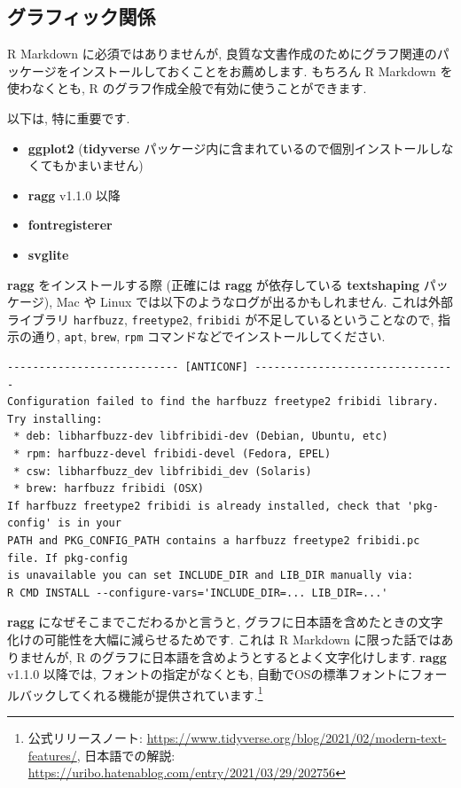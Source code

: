 \documentclass[
]{ltjsarticle}
\providecommand{\tightlist}{%
  \setlength{\itemsep}{0pt}\setlength{\parskip}{0pt}}
\begin{document}
\hypertarget{ux30b0ux30e9ux30d5ux30a3ux30c3ux30afux95a2ux4fc2}{%
\subsection{グラフィック関係}\label{ux30b0ux30e9ux30d5ux30a3ux30c3ux30afux95a2ux4fc2}}

R Markdown に必須ではありませんが, 良質な文書作成のためにグラフ関連のパッケージをインストールしておくことをお薦めします. もちろん R Markdown を使わなくとも, R のグラフ作成全般で有効に使うことができます.

以下は, 特に重要です.

\begin{itemize}
\tightlist
\item
  \textbf{ggplot2} (\textbf{tidyverse} パッケージ内に含まれているので個別インストールしなくてもかまいません)
\item
  \textbf{ragg} v1.1.0 以降
\item
  \textbf{fontregisterer}
\item
  \textbf{svglite}
\end{itemize}

\textbf{ragg} をインストールする際 (正確には \textbf{ragg} が依存している \textbf{textshaping} パッケージ), Mac や Linux では以下のようなログが出るかもしれません. これは外部ライブラリ \texttt{harfbuzz}, \texttt{freetype2}, \texttt{fribidi} が不足しているということなので, 指示の通り, \texttt{apt}, \texttt{brew}, \texttt{rpm} コマンドなどでインストールしてください.

\begin{verbatim}
--------------------------- [ANTICONF] --------------------------------
Configuration failed to find the harfbuzz freetype2 fribidi library. Try installing:
 * deb: libharfbuzz-dev libfribidi-dev (Debian, Ubuntu, etc)
 * rpm: harfbuzz-devel fribidi-devel (Fedora, EPEL)
 * csw: libharfbuzz_dev libfribidi_dev (Solaris)
 * brew: harfbuzz fribidi (OSX)
If harfbuzz freetype2 fribidi is already installed, check that 'pkg-config' is in your
PATH and PKG_CONFIG_PATH contains a harfbuzz freetype2 fribidi.pc file. If pkg-config
is unavailable you can set INCLUDE_DIR and LIB_DIR manually via:
R CMD INSTALL --configure-vars='INCLUDE_DIR=... LIB_DIR=...'
\end{verbatim}

\textbf{ragg} になぜそこまでこだわるかと言うと, グラフに日本語を含めたときの文字化けの可能性を大幅に減らせるためです. これは R Markdown に限った話ではありませんが, R のグラフに日本語を含めようとするとよく文字化けします. \textbf{ragg} v1.1.0 以降では, フォントの指定がなくとも, 自動でOSの標準フォントにフォールバックしてくれる機能が提供されています.\footnote{公式リリースノート: \url{https://www.tidyverse.org/blog/2021/02/modern-text-features/}, 日本語での解説: \url{https://uribo.hatenablog.com/entry/2021/03/29/202756}}
\end{document}

